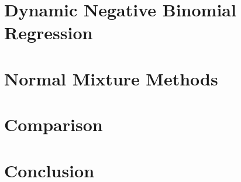 \documentclass[11pt]{article}
\begin{document}
\section{Dynamic Negative Binomial Regression}

\section{Normal Mixture Methods}

\section{Comparison}

\section{Conclusion}

{}

\end{document}
